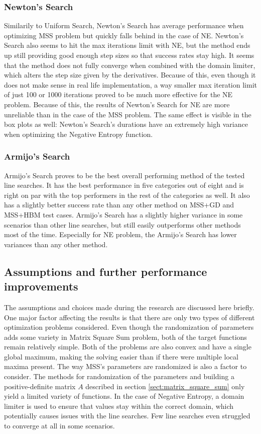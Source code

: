 \documentclass[a4paper,english,titlepage,12pt]{article}
\begin{document}
\subsubsection*{Newton's Search}

Similarily to Uniform Search, Newton's Search has average performance when optimizing MSS problem but quickly falls behind in the case of NE. Newton's Search also seems to hit the max iterations limit with NE, but the method ends up still providing good enough step sizes so that success rates stay high. It seems that the method does not fully converge when combined with the domain limiter, which alters the step size given by the derivatives. Because of this, even though it does not make sense in real life implementation, a way smaller max iteration limit of just 100 or 1000 iterations proved to be much more effective for the NE problem. Because of this, the results of Newton's Search for NE are more unreliable than in the case of the MSS problem. The same effect is visible in the box plots as well: Newton's Search's durations have an extremely high variance when optimizing the Negative Entropy function.

\subsubsection*{Armijo's Search}

Armijo's Search proves to be the best overall performing method of the tested line searches. It has the best performance in five categories out of eight and is right on par with the top performers in the rest of the categories as well. It also has a slightly better success rate than any other method on MSS+GD and MSS+HBM test cases. Armijo's Search has a slightly higher variance in some scenarios than other line searches, but still easily outperforms other methods most of the time. Especially for NE problem, the Armijo's Search has lower variances than any other method.

\subsection{Assumptions and further performance improvements}

The assumptions and choices made during the research are discussed here briefly. One major factor affecting the results is that there are only two types of different optimization problems considered. Even though the randomization of parameters adds some variety in Matrix Square Sum problem, both of the target functions remain relatively simple. Both of the problems are also convex and have a single global maximum, making the solving easier than if there were multiple local maxima present. The way MSS's parameters are randomized is also a factor to consider. The methods for randomization of the parameters and building a positive-definite matrix $A$ described in section \ref{sect:matrix_square_sum} only yield a limited variety of functions. In the case of Negative Entropy, a domain limiter is used to ensure that values stay within the correct domain, which potentially causes issues with the line searches. Few line searches even struggled to converge at all in some scenarios.
\end{document}
